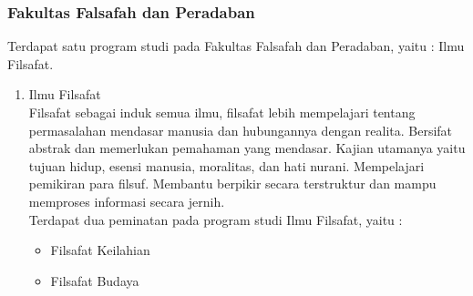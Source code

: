 \subsubsection{Fakultas Falsafah dan Peradaban}
Terdapat satu program studi pada Fakultas Falsafah dan Peradaban, yaitu : Ilmu Filsafat.
	
	\begin{enumerate}
		\item Ilmu Filsafat\\
			 Filsafat sebagai induk semua ilmu, filsafat lebih mempelajari tentang permasalahan mendasar manusia dan hubungannya dengan realita. Bersifat abstrak dan memerlukan pemahaman yang mendasar. Kajian utamanya yaitu tujuan hidup, esensi manusia, moralitas, dan hati nurani. Mempelajari pemikiran para filsuf. Membantu berpikir secara terstruktur dan mampu memproses informasi secara jernih.\\
			
			Terdapat dua peminatan pada program studi Ilmu Filsafat, yaitu :
			
			\begin{itemize}
				\item Filsafat Keilahian
				\item Filsafat Budaya
			\end{itemize}\leavevmode
			
	\end{enumerate}\leavevmode
	
